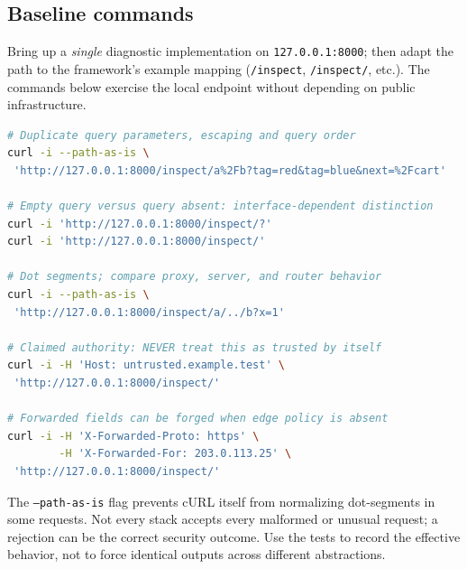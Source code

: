 \documentclass[10pt,letterpaper,oneside]{article}
\newcommand{\code}[1]{\texttt{#1}}
\begin{document}
\subsection{Baseline commands}
Bring up a \emph{single} diagnostic implementation on \code{127.0.0.1:8000}; then adapt the path to the framework's example mapping (\code{/inspect}, \code{/inspect/}, etc.). The commands below exercise the local endpoint without depending on public infrastructure.
\begin{lstlisting}[language=bash,caption={cURL smoke tests: local development instance}]
# Duplicate query parameters, escaping and query order
curl -i --path-as-is \
 'http://127.0.0.1:8000/inspect/a%2Fb?tag=red&tag=blue&next=%2Fcart'

# Empty query versus query absent: interface-dependent distinction
curl -i 'http://127.0.0.1:8000/inspect/?'
curl -i 'http://127.0.0.1:8000/inspect/'

# Dot segments; compare proxy, server, and router behavior
curl -i --path-as-is \
 'http://127.0.0.1:8000/inspect/a/../b?x=1'

# Claimed authority: NEVER treat this as trusted by itself
curl -i -H 'Host: untrusted.example.test' \
 'http://127.0.0.1:8000/inspect/'

# Forwarded fields can be forged when edge policy is absent
curl -i -H 'X-Forwarded-Proto: https' \
        -H 'X-Forwarded-For: 203.0.113.25' \
 'http://127.0.0.1:8000/inspect/'
\end{lstlisting}
The \code{--path-as-is} flag prevents cURL itself from normalizing dot-segments in some requests. Not every stack accepts every malformed or unusual request; a rejection can be the correct security outcome. Use the tests to record the effective behavior, not to force identical outputs across different abstractions.
\end{document}
